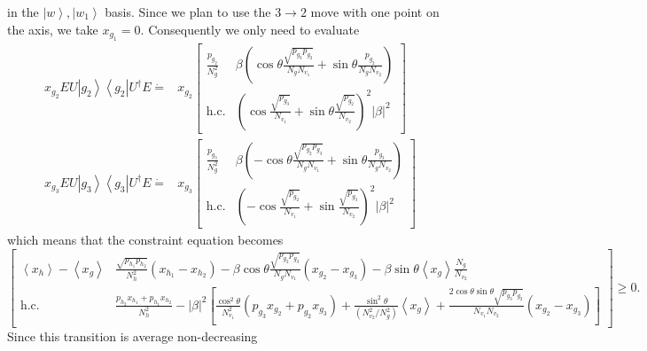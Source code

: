 \documentclass{theoretics}
\begin{document}
in the $\left|w\right\rangle ,\left|w_{1}\right\rangle $ basis. Since
we plan to use the $3\to2$ move with one point on the axis, we take
$x_{g_{1}}=0$. Consequently we only need to evaluate
\begin{align*}
  x_{g_{2}}EU\left|g_{2}\right\rangle \left\langle g_{2}\right|U^{\dagger}E\dot{=} & x_{g_{2}}\left[\begin{array}{cc}
                                                                                                        \frac{p_{g_{2}}}{N_{g}^{2}} & \beta\left(\cos\theta\frac{\sqrt{p_{g_{3}}p_{g_{2}}}}{N_{g}N_{v_{1}}}+\sin\theta\frac{p_{g_{2}}}{N_{g}N_{v_{2}}}\right)    \\
                                                                                                        \text{h.c.}                 & \left(\cos\frac{\sqrt{p_{g_{3}}}}{N_{v_{1}}}+\sin\theta\frac{\sqrt{p_{g_{2}}}}{N_{v_{2}}}\right)^{2}\left|\beta\right|^{2}
                                                                                                      \end{array}\right] \\
  x_{g_{3}}EU\left|g_{3}\right\rangle \left\langle g_{3}\right|U^{\dagger}E\dot{=} & x_{g_{3}}\left[\begin{array}{cc}
                                                                                                        \frac{p_{g_{3}}}{N_{g}^{2}} & \beta\left(-\cos\theta\frac{\sqrt{p_{g_{2}}p_{g_{3}}}}{N_{g}N_{v_{1}}}+\sin\theta\frac{p_{g_{3}}}{N_{g}N_{v_{2}}}\right) \\
                                                                                                        \text{h.c.}                 & \left(-\cos\frac{\sqrt{p_{g_{2}}}}{N_{v_{1}}}+\sin\frac{\sqrt{p_{g_{3}}}}{N_{v_{2}}}\right)^{2}\left|\beta\right|^{2}
                                                                                                      \end{array}\right]
\end{align*}
which means that the constraint equation becomes {\footnotesize 
    \begin{displaymath}
      \left[\begin{array}{cc}
          \left\langle x_{h}\right\rangle -\left\langle x_{g}\right\rangle & \frac{\sqrt{p_{h_{1}}p_{h_{2}}}}{N_{h}^{2}}(x_{h_{1}}-x_{h_{2}})-\beta\cos\theta\frac{\sqrt{p_{g_{2}}p_{g_{3}}}}{N_{g}N_{v_{1}}}(x_{g_{2}}-x_{g_{3}})-\beta\sin\theta\left\langle x_{g}\right\rangle \frac{N_{g}}{N_{v_{2}}}                                                                                                                                                 \\
          \text{h.c.}                                                      & \frac{p_{h_{2}}x_{h_{1}}+p_{h_{1}}x_{h_{2}}}{N_{h}^{2}}-\left|\beta\right|^{2}\left[\frac{\cos^{2}\theta}{N_{v_{1}}^{2}}(p_{g_{3}}x_{g_{2}}+p_{g_{2}}x_{g_{3}})+\frac{\sin^{2}\theta}{\left(N_{v_{2}}^{2}/N_{g}^{2}\right)}\left\langle x_{g}\right\rangle +\frac{2\cos\theta\sin\theta\sqrt{p_{g_{3}}p_{g_{2}}}}{N_{v_{1}}N_{v_{2}}}\left(x_{g_{2}}-x_{g_{3}}\right)\right]
        \end{array}\right]\ge0.
    \end{displaymath}
  }Since this transition is average non-decreasing
\end{document}
